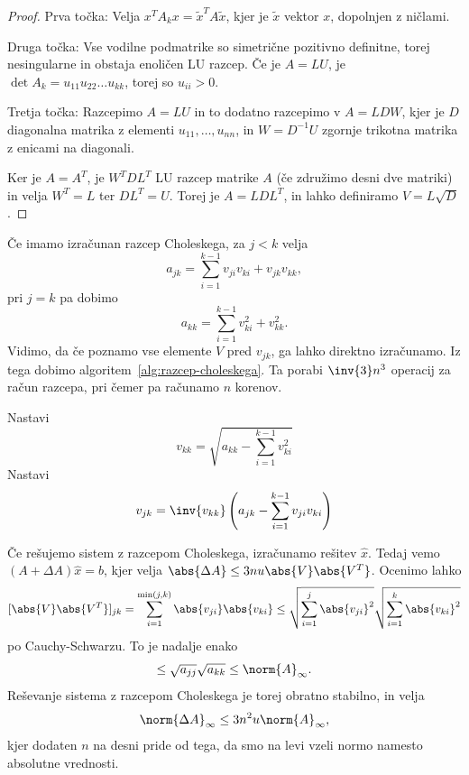 \begin{proof}
  Prva točka:
  Velja $x^T A_k x = \tilde{x}^T A \tilde{x}$, kjer je $\tilde{x}$ vektor $x$,
  dopolnjen z ničlami.

  Druga točka:
  Vse vodilne podmatrike so simetrične pozitivno definitne, torej nesingularne
  in obstaja enoličen LU razcep.
  Če je $A = LU$, je $\det A_k = u_{11} u_{22} \ldots u_{kk}$, torej so $u_{ii}
  > 0$.

  Tretja točka:
  Razcepimo $A = LU$ in to dodatno razcepimo v $A = L D W$, kjer je $D$
  diagonalna matrika z elementi $u_{11}, \ldots, u_{nn}$, in $W = D^{-1} U$
  zgornje trikotna matrika z enicami na diagonali.

  Ker je $A = A^T$, je $W^T D L^T$ LU razcep matrike $A$ (če združimo desni dve
  matriki) in velja $W^T = L$ ter $D L^T = U$.
  Torej je $A = LDL^T$, in lahko definiramo $V = L \sqrt{D}$.
\end{proof}


Če imamo izračunan razcep Choleskega, za $j < k$ velja
\[
  a_{jk} = \sum_{i=1}^{k-1} v_{ji} v_{ki} + v_{jk} v_{kk},
\]
pri $j=k$ pa dobimo
\[
  a_{kk} = \sum_{i=1}^{k-1} v_{ki}^2 + v_{kk}^2.
\]
Vidimo, da če poznamo vse elemente $V$ pred $v_{jk}$, ga lahko direktno
izračunamo.
Iz tega dobimo algoritem~\ref{alg:razcep-choleskega}.
Ta porabi $\inv{3} n^3$ operacij za račun razcepa, pri čemer pa računamo $n$
korenov.

\begin{algorithm}
  \caption{Razcep Choleskega}
  \label{alg:razcep-choleskega}
  \begin{algorithmic}
	\State Nastavi
	\[
	  v_{kk} = \sqrt{ a_{kk} - \sum_{i=1}^{k-1} v_{ki}^2 }
	\]
	\State Nastavi
	\[
	  v_{jk} = \inv{v_{kk}} \left( a_{jk} - \sum_{i=1}^{k-1} v_{ji} v_{ki} \right)
	\]
	\EndFor
	\EndFor
  \end{algorithmic}
\end{algorithm}


Če rešujemo sistem z razcepom Choleskega, izračunamo rešitev $\hat{x}$.
Tedaj vemo $(A + \Delta A) \hat{x} = b$, kjer velja $\abs{\Delta A} \le 3 nu
\abs{V} \abs{V^T}$.
Ocenimo lahko
\[
  [ \abs{V} \abs{V^T} ]_{jk} = \sum_{i=1}^{\min(j,k)} \abs{v_{ji}} \abs{v_{ki}}
  \le \sqrt{ \sum_{i=1}^j \abs{v_{ji}}^2 } \sqrt{ \sum_{i=1}^k \abs{v_{ki}}^2 }
\]
po Cauchy-Schwarzu.
To je nadalje enako
\[
  \le \sqrt{a_{jj}} \sqrt{a_{kk}} \le \norm{A}_\infty.
\]
Reševanje sistema z razcepom Choleskega je torej obratno stabilno, in velja
\[
  \norm{\Delta A}_\infty \le 3 n^2 u \norm{A}_\infty,
\]
kjer dodaten $n$ na desni pride od tega, da smo na levi vzeli normo namesto
absolutne vrednosti.

